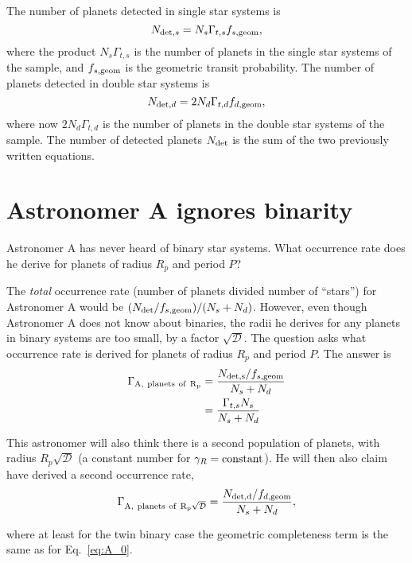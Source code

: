 \documentclass{emulateapj}
\begin{document}
The number of planets detected in single star systems is
\begin{equation}
N_{{\rm det},s} = N_s \Gamma_{t,s} f_{s,{\rm geom}},
\label{eq:N_det_s}
\end{equation}
where the product $N_s \Gamma_{t,s}$ is the number of planets in the single 
star systems of the sample, and $f_{s,{\rm geom}}$ is the geometric transit 
probability.
The number of planets detected in double star systems is
\begin{equation}
N_{{\rm det},d} = 2 N_d \Gamma_{t,d} f_{d,{\rm geom}},
\label{eq:N_det_d}
\end{equation}
where now $2 N_d \Gamma_{t,d}$ is the number of planets in the double star 
systems of the sample.
The number of detected planets $N_{\rm det}$ is the sum of the two previously 
written equations.


\section{Astronomer A ignores binarity}
Astronomer A has never heard of binary star systems. What occurrence rate does 
he derive for planets of radius $R_p$ and period $P$?

The {\it total} occurrence rate (number of planets divided number of 
``stars'') for Astronomer A would be $(N_{\rm det}/f_{s,{\rm geom}})/(N_s + 
N_d)$. However, even though Astronomer A does not know about binaries, the 
radii he derives for any planets in binary systems are too small, by a factor 
$\sqrt{\mathcal{D}}$. The question asks what occurrence rate is derived for 
planets of radius $R_p$ and period $P$.
The answer is
\begin{align}
\Gamma_{\rm A,\ planets\ of\ R_p} &= \frac{N_{\rm det,s}/f_{s,{\rm geom}}}{N_s 
+ N_d}
\label{eq:A_0} \\
&= \frac{\Gamma_{t,s} N_s}{N_s + N_d}
\end{align}

This astronomer will also think there is a second population of planets, with 
radius $R_p \sqrt{\mathcal{D}}$ (a constant number for $\gamma_R = {\rm 
constant}$). He will then also claim
have derived a second occurrence rate,
\begin{equation}
\Gamma_{\rm A,\ planets\ of\ R_p \sqrt{\mathcal{D}}} = \frac{N_{\rm 
det,d}/f_{d,{\rm geom}}}{N_s + N_d},
\end{equation}

where at least for the twin binary case the geometric completeness term is the 
same as for Eq.~\ref{eq:A_0}.
\end{document}
